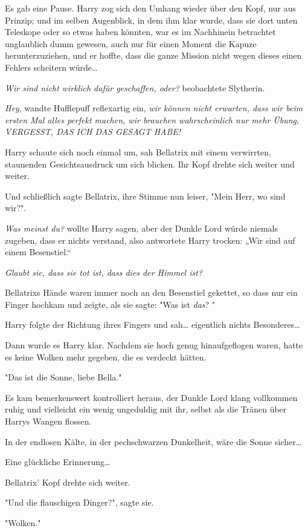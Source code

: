 {Es gab eine Pause. Harry zog sich den Umhang wieder über den Kopf, nur aus Prinzip; und im selben Augenblick, in dem ihm klar wurde, dass sie dort unten Teleskope oder so etwas haben könnten, war es im Nachhinein betrachtet unglaublich dumm gewesen, auch nur für einen Moment die Kapuze herunterzuziehen, und er hoffte, dass die ganze Mission nicht wegen dieses einen Fehlers scheitern würde…

\emph{Wir sind nicht wirklich dafür geschaffen, oder?} beobachtete Slytherin.

\emph{Hey}, wandte Hufflepuff reflexartig ein, \emph{wir können nicht erwarten, dass wir beim ersten Mal alles perfekt machen, wir brauchen wahrscheinlich nur mehr Übung, VERGESST, DAS ICH DAS GESAGT HABE!}

Harry schaute sich noch einmal um, sah Bellatrix mit einem verwirrten, staunenden Gesichtsausdruck um sich blicken. Ihr Kopf drehte sich weiter und weiter.

Und schließlich sagte Bellatrix, ihre Stimme nun leiser, "Mein Herr, wo sind wir?".

\emph{Was meinst du?} wollte Harry sagen, aber der Dunkle Lord würde niemals zugeben, dass er nichts verstand, also antwortete Harry trocken: „Wir sind auf einem Besenstiel.“

\emph{Glaubt sie, dass sie tot ist, dass dies der Himmel ist?}

Bellatrixs Hände waren immer noch an den Besenstiel gekettet, so dass nur ein Finger hochkam und zeigte, als sie sagte: "Was ist \emph{das}? "

Harry folgte der Richtung ihres Fingers und sah… eigentlich nichts Besonderes…

Dann wurde es Harry klar. Nachdem sie hoch genug hinaufgeflogen waren, hatte es keine Wolken mehr gegeben, die es verdeckt hätten.

"Das ist die Sonne, liebe Bella."

Es kam bemerkenswert kontrolliert heraus, der Dunkle Lord klang vollkommen ruhig und vielleicht ein wenig ungeduldig mit ihr, selbst als die Tränen über Harrys Wangen flossen.

In der endlosen Kälte, in der pechschwarzen Dunkelheit, wäre die Sonne sicher…

Eine glückliche Erinnerung…

Bellatrix' Kopf drehte sich weiter.

"Und die flauschigen Dinger?", sagte sie.

"Wolken."

}
